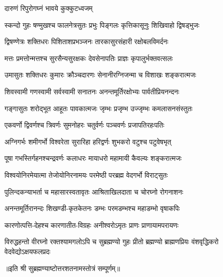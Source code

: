 
{दारुणं रिपुरोगघ्नं भावये कुक्कुटध्वजम्}

\twolineshloka
{स्कन्दो गुहः षण्मुखश्च फालनेत्रसुतः प्रभुः}
{पिङ्गलः कृत्तिकासूनुः शिखिवाहो द्विषड्भुजः}%

\twolineshloka
{द्विषण्णेत्रः शक्तिधरः पिशिताशप्रभञ्जनः}
{तारकासुरसंहारी रक्षोबलविमर्दनः}%

\twolineshloka
{मत्तः प्रमत्तोन्मत्तश्च सुरसैन्यसुरक्षकः}
{देवसेनापतिः प्राज्ञः कृपालुर्भक्तवत्सलः}%

\twolineshloka
{उमासुतः शक्तिधरः कुमारः क्रौञ्चदारणः}
{सेनानीरग्निजन्मा च विशाखः शङ्करात्मजः}%

\twolineshloka
{शिवस्वामी गणस्वामी सर्वस्वामी सनातनः}
{अनन्तमूर्तिरक्षोभ्यः पार्वतीप्रियनन्दनः}%

\twolineshloka
{गङ्गासुतः शरोद्भूत आहूतः पावकात्मजः}
{जृम्भः प्रजृम्भ उज्जृम्भः कमलासनसंस्तुतः}%

\twolineshloka
{एकवर्णो द्विवर्णश्च त्रिवर्णः सुमनोहरः}
{चतुर्वर्णः पञ्चवर्णः प्रजापतिरहःपतिः}%

\twolineshloka
{अग्निगर्भः शमीगर्भो विश्वरेता सुरारिहा}
{हरिद्वर्णः शुभकरो वटुश्च पटुवेषभृत्}%

\twolineshloka
{पूषा गभस्तिर्गहनश्चन्द्रवर्णः कलाधरः}
{मायाधरो महामायी कैवल्यः शङ्करात्मजः}%

\twolineshloka
{विश्वयोनिरमेयात्मा तेजोयोनिरनामयः}
{परमेष्ठी परब्रह्म वेदगर्भो विराट्सुतः}%

\twolineshloka
{पुलिन्दकन्याभर्ता च महासारस्वतावृतः}
{आश्रिताखिलदाता च चोरघ्नो रोगनाशनः}%

\twolineshloka
{अनन्तमूर्तिरानन्दः शिखण्डी-कृतकेतनः}
{डम्भः परमडम्भश्च महाडम्भो वृषाकपिः}%

\twolineshloka
{कारणोत्पत्ति-देहश्च कारणातीत-विग्रहः}
{अनीश्वरोऽमृतः प्राणः प्राणायामपरायणः}%

\threelineshloka
{विरुद्धहन्तो वीरघ्नो रक्तश्यामगलोऽपि च}
{सुब्रह्मण्यो गुहः प्रीतो ब्रह्मण्यो ब्राह्मणप्रियः}
{वंशवृद्धिकरो वेदवेद्योऽक्षयफलप्रदः}%

॥इति श्री सुब्रह्मण्याष्टोत्तरशतनामस्तोत्रं सम्पूर्णम्॥